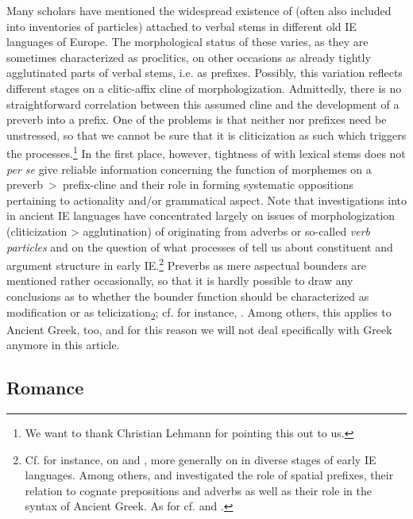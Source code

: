 \documentclass[output=paper]{langsci/langscibook}
\begin{document}
Many scholars have mentioned the widespread existence of  (often also included into inventories of particles) attached to verbal stems in different old IE languages of Europe. The morphological status of these  varies, as they are sometimes characterized as proclitics, on other occasions as already tightly agglutinated parts of verbal stems, i.e. as prefixes. Possibly, this variation reflects different stages on a clitic-affix cline of morphologization. Admittedly, there is no straightforward correlation between this assumed cline and the development of a preverb into a prefix. One of the problems is that neither  nor prefixes need be unstressed, so that we cannot be sure that it is cliticization as such which triggers the processes.\footnote{We want to thank Christian Lehmann for pointing this out to us.} In the first place, however, tightness of  with lexical stems does not \textit{per se} give reliable information concerning the function of morphemes on a preverb~{\textgreater}~prefix-cline and their role in forming systematic oppositions pertaining to actionality and/or grammatical aspect. Note that investigations into  in ancient IE languages have concentrated largely on issues of morphologization (cliticization {\textgreater} agglutination) of  originating from adverbs or so-called \textit{verb particles} and on the question of what processes of  tell us about constituent and argument structure in early IE.\footnote{Cf. for instance, \citet{Vincent1999} on  and , \citet{Boley2004,Cuzzolin2006} more generally on  in diverse stages of early IE languages. Among others, \citet{Luraghi2003} and \citet{Viti2008} investigated the role of spatial prefixes, their relation to cognate prepositions and adverbs as well as their role in the syntax of Ancient Greek. As for  cf. \citet[557--566]{Leumann1977[1926]}
 and \citet{Haverling2003}.}  Preverbs as mere aspectual bounders are mentioned rather occasionally, so that it is hardly possible to draw any conclusions as to whether the bounder function should be characterized as modification or as telicization\textsubscript{2}; cf. for instance, \citet[10]{Cuzzolin2006}. Among others, this applies to Ancient Greek, too, and for this reason we will not deal specifically with Greek anymore in this article.

\subsection{Romance}\label{sec:wiemerserzant:5.1}
\end{document}
